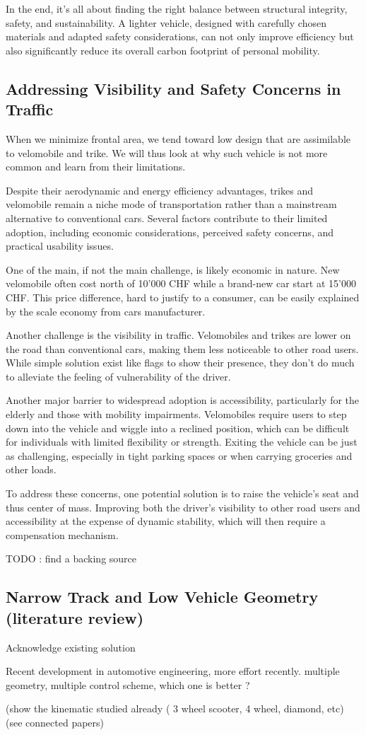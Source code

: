 In the end, it's all about finding the right balance between structural integrity, safety, and sustainability. A lighter vehicle, designed with carefully chosen materials and adapted safety considerations, can not only improve efficiency but also significantly reduce its overall carbon footprint of personal mobility.

\subsection{Addressing Visibility and Safety Concerns in Traffic}

When we minimize frontal area, we tend toward low design that are assimilable to velomobile and trike. We will thus look at why such vehicle is not more common and learn from their limitations.

Despite their aerodynamic and energy efficiency advantages, trikes and velomobile remain a niche mode of transportation rather than a mainstream alternative to conventional cars. Several factors contribute to their limited adoption, including economic considerations, perceived safety concerns, and practical usability issues.

One of the main, if not the main challenge, is likely economic in nature. New velomobile often cost north of 10'000 CHF while a brand-new car start at 15'000 CHF. This price difference, hard to justify to a consumer, can be easily explained by the scale economy from cars manufacturer. 

Another challenge is the visibility in traffic. Velomobiles and trikes are lower on the road than conventional cars, making them less noticeable to other road users. While simple solution exist like flags to show their presence, they don't do much to alleviate the feeling of vulnerability of the driver. \cite{velomobile_safety}

Another major barrier to widespread adoption is accessibility, particularly for the elderly and those with mobility impairments. Velomobiles require users to step down into the vehicle and wiggle into a reclined position, which can be difficult for individuals with limited flexibility or strength. Exiting the vehicle can be just as challenging, especially in tight parking spaces or when carrying groceries and other loads.

To address these concerns, one potential solution is to raise the vehicle’s seat and thus center of mass. Improving both the driver’s visibility to other road users and accessibility at the expense of dynamic stability, which will then require a compensation mechanism.


TODO : find a backing source
\newpage

\subsection{Narrow Track and Low Vehicle Geometry (literature review)}
Acknowledge existing solution

Recent development in automotive engineering, more effort recently. multiple geometry, multiple control scheme, which one is better ?

(show the kinematic studied already ( 3 wheel scooter, 4 wheel, diamond, etc) (see connected papers)